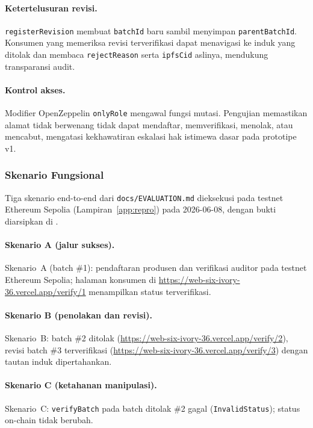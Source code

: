 \paragraph{Ketertelusuran revisi.}
\texttt{registerRevision} membuat \texttt{batchId} baru sambil menyimpan \texttt{parentBatchId}.
Konsumen yang memeriksa revisi terverifikasi dapat menavigasi ke induk yang ditolak dan membaca \texttt{rejectReason} serta \texttt{ipfsCid} aslinya, mendukung transparansi audit.

\paragraph{Kontrol akses.}
Modifier OpenZeppelin \texttt{onlyRole} mengawal fungsi mutasi.
Pengujian memastikan alamat tidak berwenang tidak dapat mendaftar, memverifikasi, menolak, atau mencabut, mengatasi kekhawatiran eskalasi hak istimewa dasar pada prototipe v1.

\subsubsection{Skenario Fungsional}
Tiga skenario end-to-end dari \texttt{docs/EVALUATION.md} dieksekusi pada testnet Ethereum Sepolia (Lampiran~\ref{app:repro}) pada 2026-06-08, dengan bukti diarsipkan di .

\paragraph{Skenario A (jalur sukses).}
Skenario~A (batch \#1): pendaftaran produsen dan verifikasi auditor pada testnet Ethereum Sepolia; halaman konsumen di \url{https://web-six-ivory-36.vercel.app/verify/1} menampilkan status terverifikasi.

\paragraph{Skenario B (penolakan dan revisi).}
Skenario~B: batch \#2 ditolak (\url{https://web-six-ivory-36.vercel.app/verify/2}), revisi batch \#3 terverifikasi (\url{https://web-six-ivory-36.vercel.app/verify/3}) dengan tautan induk dipertahankan.

\paragraph{Skenario C (ketahanan manipulasi).}
Skenario~C: \texttt{verifyBatch} pada batch ditolak \#2 gagal (\texttt{InvalidStatus}); status on-chain tidak berubah.

